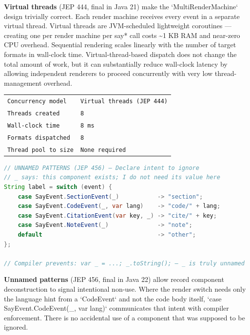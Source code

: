 \documentclass[11pt]{article}
\begin{document}
\textbf{Virtual threads} (JEP 444, final in Java 21) make the `MultiRenderMachine` design trivially correct. Each render machine receives every event in a separate virtual thread. Virtual threads are JVM-scheduled lightweight coroutines — creating one per render machine per say* call costs \textasciitilde{}1 KB RAM and near-zero CPU overhead. Sequential rendering scales linearly with the number of target formats in wall-clock time. Virtual-thread-based dispatch does not change the total amount of work, but it can substantially reduce wall-clock latency by allowing independent renderers to proceed concurrently with very low thread-management overhead.
\cite{OpenJDK2024}

\begin{table}[h]
\centering
\begin{tabular}{|l|l|}
\hline
\texttt{Concurrency model} & \texttt{Virtual threads (JEP 444)} \\
\texttt{Threads created} & \texttt{8} \\
\texttt{Wall-clock time} & \texttt{8 ms} \\
\texttt{Formats dispatched} & \texttt{8} \\
\texttt{Thread pool to size} & \texttt{None required} \\
\hline
\end{tabular}
\end{table}


\begin{lstlisting}[language=java]
// UNNAMED PATTERNS (JEP 456) — Declare intent to ignore
// _ says: this component exists; I do not need its value here
String label = switch (event) {
    case SayEvent.SectionEvent(_)           -> "section";
    case SayEvent.CodeEvent(_, var lang)    -> "code/" + lang;
    case SayEvent.CitationEvent(var key, _) -> "cite/" + key;
    case SayEvent.NoteEvent(_)              -> "note";
    default                                 -> "other";
};

// Compiler prevents: var _ = ...; _.toString(); — _ is truly unnamed
\end{lstlisting}


\textbf{Unnamed patterns} (JEP 456, final in Java 22) allow record component deconstruction to signal intentional non-use. Where the render switch needs only the language hint from a `CodeEvent` and not the code body itself, `case SayEvent.CodeEvent(\_, var lang)` communicates that intent with compiler enforcement. There is no accidental use of a component that was supposed to be ignored.
\end{document}
